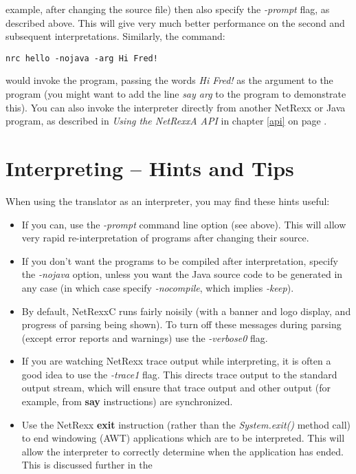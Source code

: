 example, after changing the source file) then also specify
the \emph{-prompt} flag, as described above.  This will give very much
better performance on the second and subsequent interpretations.
\newline
Similarly, the command:
\begin{verbatim}
nrc hello -nojava -arg Hi Fred!
\end{verbatim}
would invoke the program, passing the words \emph{Hi Fred!} as
the argument to the program (you might want to add the line \emph{say
arg} to the program to demonstrate this).
\newline
You can also invoke the interpreter directly from another NetRexx or
Java program, as described in \emph{Using the NetRexxA
API} in chapter \ref{api} on page \pageref{api}.

\section{Interpreting -- Hints and Tips}

When using the translator as an interpreter, you may find these hints
useful:
\begin{itemize}
\item If you can, use the \emph{-prompt} command line option (see above).
This will allow very rapid re-interpretation of programs after changing
their source.
\item If you don't want the programs to be compiled after interpretation,
specify the \emph{-nojava} option, unless you want the Java source code
to be generated in any case (in which case specify \emph{-nocompile},
which implies \emph{-keep}).
\item By default, NetRexxC runs fairly noisily (with a banner and logo
display, and progress of parsing being shown).  To turn off these
messages during parsing (except error reports and warnings) use
the \emph{-verbose0} flag.
\item
{}
If you are watching NetRexx trace output while interpreting, it is often
a good idea to use the \emph{-trace1} flag.  This directs trace output
to the standard output stream, which will ensure that trace output and
other output (for example, from \textbf{say} instructions) are
synchronized.
\item
Use the NetRexx \textbf{exit} instruction (rather than the \emph{System.exit()}
method call) to end windowing (AWT) applications which are to be
interpreted.  This will allow the interpreter to correctly determine
when the application has ended.  This is discussed further in the
\cite{Interpreter restrictions}
\end{itemize}


